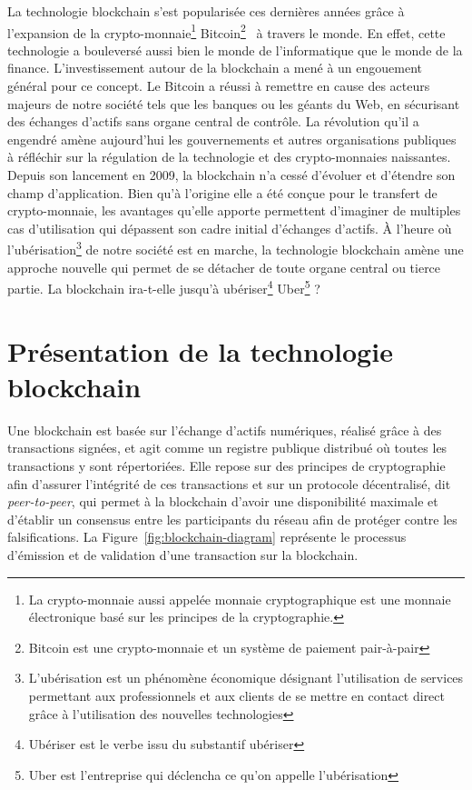 \documentclass{tnreport}
\begin{document}
La technologie blockchain s'est popularisée ces dernières années grâce à l'expansion de la crypto-monnaie\footnote{La crypto-monnaie aussi appelée monnaie cryptographique est une monnaie électronique basé sur les principes de la cryptographie.} Bitcoin\footnote{Bitcoin est une crypto-monnaie et un système de paiement pair-à-pair}~\cite{Bitcoin} à travers le monde. 
En effet, cette technologie a bouleversé aussi bien le monde de l'informatique que le monde de la finance. 
L'investissement autour de la blockchain a mené à un engouement général pour ce concept. 
Le Bitcoin a réussi à remettre en cause des acteurs majeurs de notre société tels que les banques ou les géants du Web, en sécurisant des échanges d'actifs sans organe central de contrôle. 
La révolution qu'il a engendré amène aujourd'hui les gouvernements et autres organisations publiques à réfléchir sur la régulation de la technologie et des crypto-monnaies naissantes.
Depuis son lancement en 2009, la blockchain n'a cessé d'évoluer et d'étendre son champ d'application.
Bien qu'à l'origine elle a été conçue pour le transfert de crypto-monnaie, les avantages qu'elle apporte permettent d'imaginer de multiples cas d'utilisation qui dépassent son cadre initial d'échanges d'actifs.
À l'heure où l'ubérisation\footnote{L'ubérisation est un phénomène économique désignant l'utilisation de services permettant aux professionnels et aux clients de se mettre en contact direct grâce à l'utilisation des nouvelles technologies} de notre société est en marche, la technologie blockchain amène une approche nouvelle qui permet de se détacher de toute organe central ou tierce partie. 
La blockchain ira-t-elle jusqu'à ubériser\footnote{Ubériser est le verbe issu du substantif ubériser} Uber\footnote{Uber est l'entreprise qui déclencha ce qu'on appelle l'ubérisation} ?

\section{Présentation de la technologie blockchain}

Une blockchain est basée sur l'échange d'actifs numériques, réalisé grâce à des transactions signées, et agit comme un registre publique distribué où toutes les transactions y sont répertoriées. Elle repose sur des principes de cryptographie afin d'assurer l'intégrité de ces transactions et sur un protocole décentralisé, dit {\em peer-to-peer}, qui permet à la blockchain d'avoir une disponibilité maximale et d'établir un consensus entre les participants du réseau afin de protéger contre les falsifications. La Figure~\ref{fig:blockchain-diagram} représente le processus d'émission et de validation d'une transaction sur la blockchain.
\end{document}
